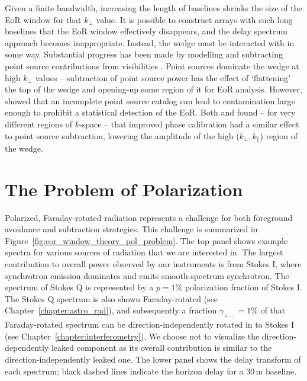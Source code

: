 Given a finite bandwidth, increasing the length of baselines shrinks the size of the EoR window for that $k_{\perp}$ value. It is possible to construct arrays with such long baselines that the EoR window effectively disappears, and the delay spectrum approach becomes inappropriate. Instead, the wedge must be interacted with in some way. Substantial progress has been made by modelling and subtracting point source contributions from visibilities \citep[e.g.][]{Patil.17}. Point sources dominate the wedge at high $k_{\perp}$ values \citep[e.g.][]{Trott.12} -- subtraction of point source power has the effect of `flattening' the top of the wedge and opening-up some region of it for EoR analysis. However, \cite{Barry.16} showed that an incomplete point source catalog can lead to contamination large enough to prohibit a statistical detection of the EoR.
Both \cite{Kohn.16} and \cite{Patil.17} found -- for very different regions of $k$-space -- that improved phase calibration had a similar effect to point source subtraction, lowering the amplitude of the high ($k_{\perp},k_{\parallel}$) region of the wedge.

\section{The Problem of Polarization}
\label{sec:eor_window_problem_of_pol}

Polarized, Faraday-rotated radiation represents a challenge for both foreground avoidance and subtraction strategies. This challenge is summarized in Figure~\ref{fig:eor_window_theory_pol_problem}. The top panel shows example spectra for various sources of radiation that we are interested in. The largest contribution to overall power observed by our instruments is from Stokes I, where synchrotron emission dominates and emits smooth-spectrum synchrotron. The spectrum of Stokes Q is represented by a $p=1\%$ polarization fraction of Stokes I. The Stokes Q spectrum is also shown Faraday-rotated (see Chapter~\ref{chapter:astro_rad}), and subsequently a fraction $\gamma_{+-}=1\%$ of that Faraday-rotated spectrum can be direction-independently rotated in to Stokes I (see Chapter~\ref{chapter:interferometry}). We choose not to visualize the direction-dependently leaked component as its overall contribution is similar to the direction-independently leaked one. The lower panel shows the delay transform of each spectrum; black dashed lines indicate the horizon delay for a 30\,m baseline.

